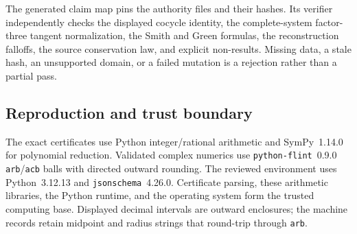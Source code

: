\documentclass[11pt]{article}
\theoremstyle{remark}
\begin{document}
The generated claim map pins the authority files and their hashes.  Its
verifier independently checks the displayed cocycle identity, the
complete-system factor-three tangent normalization, the Smith and Green formulas, the
reconstruction falloffs, the source conservation law, and explicit
non-results.  Missing data, a stale hash, an unsupported domain, or a
failed mutation is a rejection rather than a partial pass.

\subsection{Reproduction and trust boundary}

The exact certificates use Python integer/rational arithmetic and
SymPy~1.14.0 for polynomial reduction.  Validated complex numerics use
\texttt{python-flint}~0.9.0 \texttt{arb}/\texttt{acb} balls with directed
outward rounding.  The reviewed environment uses Python~3.12.13 and
\texttt{jsonschema}~4.26.0.  Certificate parsing, these arithmetic
libraries, the Python runtime, and the operating system form the trusted
computing base.  Displayed decimal intervals are outward enclosures; the
machine records retain midpoint and radius strings that round-trip through
\texttt{arb}.
\end{document}

